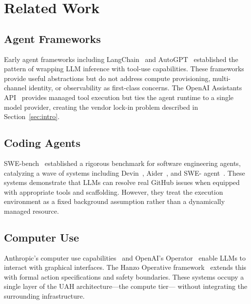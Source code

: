 \documentclass[11pt]{article}
\begin{document}
\section{Related Work}
\label{sec:related}

\subsection{Agent Frameworks}

Early agent frameworks including LangChain~\cite{langchain2022} and
AutoGPT~\cite{autogpt2023} established the pattern of wrapping LLM inference
with tool-use capabilities. These frameworks provide useful abstractions but do
not address compute provisioning, multi-channel identity, or observability as
first-class concerns. The OpenAI Assistants API~\cite{openai2023gpt4} provides
managed tool execution but ties the agent runtime to a single model provider,
creating the vendor lock-in problem described in Section~\ref{sec:intro}.

\subsection{Coding Agents}

SWE-bench~\cite{jimenez2024swebench} established a rigorous benchmark for
software engineering agents, catalyzing a wave of systems including
Devin~\cite{cognition2024devin}, Aider~\cite{aider2024}, and SWE-
agent~\cite{yang2024sweagent}. These systems demonstrate that LLMs can resolve
real GitHub issues when equipped with appropriate tools and scaffolding.
However, they treat the execution environment as a fixed background assumption
rather than a dynamically managed resource.

\subsection{Computer Use}

Anthropic's computer use capabilities~\cite{anthropic2024computer} and
OpenAI's Operator~\cite{openai2025operator} enable LLMs to interact with
graphical interfaces. The Hanzo Operative framework~\cite{hanzo2024operative}
extends this with formal action specifications and safety boundaries. These
systems occupy a single layer of the UAH architecture---the compute tier---
without integrating the surrounding infrastructure.
\end{document}
